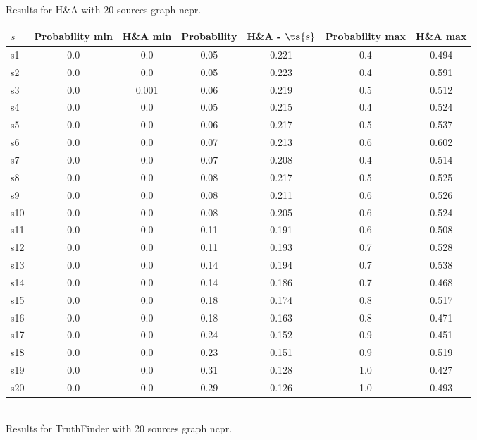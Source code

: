 \documentclass{article}
\begin{document}
\noindent Results for H\&A with 20 sources graph ncpr.

\noindent\begin{tabular}{|l|c|c|c|c|c|c|}
\hline
$s$& Probability min & H\&A min & Probability & H\&A - $\ts{s}$ & Probability max & H\&A max\\
\hline
s1 &0.0 & 0.0 & 0.05 & 0.221 & 0.4 & 0.494\\
\hline
s2 &0.0 & 0.0 & 0.05 & 0.223 & 0.4 & 0.591\\
\hline
s3 &0.0 & 0.001 & 0.06 & 0.219 & 0.5 & 0.512\\
\hline
s4 &0.0 & 0.0 & 0.05 & 0.215 & 0.4 & 0.524\\
\hline
s5 &0.0 & 0.0 & 0.06 & 0.217 & 0.5 & 0.537\\
\hline
s6 &0.0 & 0.0 & 0.07 & 0.213 & 0.6 & 0.602\\
\hline
s7 &0.0 & 0.0 & 0.07 & 0.208 & 0.4 & 0.514\\
\hline
s8 &0.0 & 0.0 & 0.08 & 0.217 & 0.5 & 0.525\\
\hline
s9 &0.0 & 0.0 & 0.08 & 0.211 & 0.6 & 0.526\\
\hline
s10 &0.0 & 0.0 & 0.08 & 0.205 & 0.6 & 0.524\\
\hline
s11 &0.0 & 0.0 & 0.11 & 0.191 & 0.6 & 0.508\\
\hline
s12 &0.0 & 0.0 & 0.11 & 0.193 & 0.7 & 0.528\\
\hline
s13 &0.0 & 0.0 & 0.14 & 0.194 & 0.7 & 0.538\\
\hline
s14 &0.0 & 0.0 & 0.14 & 0.186 & 0.7 & 0.468\\
\hline
s15 &0.0 & 0.0 & 0.18 & 0.174 & 0.8 & 0.517\\
\hline
s16 &0.0 & 0.0 & 0.18 & 0.163 & 0.8 & 0.471\\
\hline
s17 &0.0 & 0.0 & 0.24 & 0.152 & 0.9 & 0.451\\
\hline
s18 &0.0 & 0.0 & 0.23 & 0.151 & 0.9 & 0.519\\
\hline
s19 &0.0 & 0.0 & 0.31 & 0.128 & 1.0 & 0.427\\
\hline
s20 &0.0 & 0.0 & 0.29 & 0.126 & 1.0 & 0.493\\
\hline
\end{tabular}\\

\noindent Results for TruthFinder with 20 sources graph ncpr.
\end{document}
